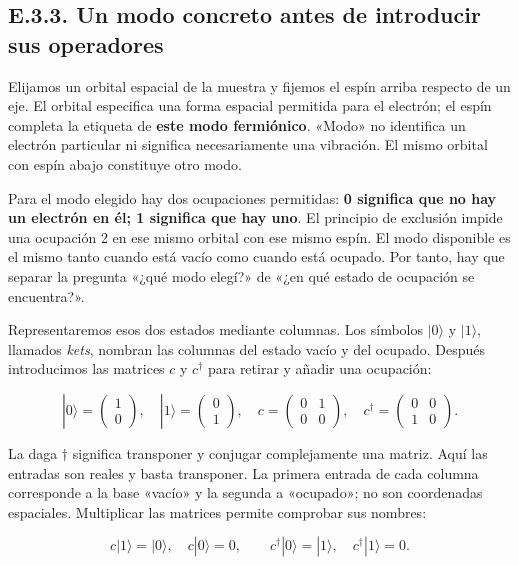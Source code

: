 \documentclass[
  spanish,
  10pt,
  a4paper,
]{article}
\begin{document}
\subsection{E.3.3. Un modo concreto antes de introducir sus
operadores}\label{e.3.3.-un-modo-concreto-antes-de-introducir-sus-operadores}

Elijamos un orbital espacial de la muestra y fijemos el espín arriba
respecto de un eje. El orbital especifica una forma espacial permitida
para el electrón; el espín completa la etiqueta de \textbf{este modo
fermiónico}. «Modo» no identifica un electrón particular ni significa
necesariamente una vibración. El mismo orbital con espín abajo
constituye otro modo.

Para el modo elegido hay dos ocupaciones permitidas: \textbf{0 significa
que no hay un electrón en él; 1 significa que hay uno}. El principio de
exclusión impide una ocupación 2 en ese mismo orbital con ese mismo
espín. El modo disponible es el mismo tanto cuando está vacío como
cuando está ocupado. Por tanto, hay que separar la pregunta «¿qué modo
elegí?» de «¿en qué estado de ocupación se encuentra?».

Representaremos esos dos estados mediante columnas. Los símbolos
\(|0\rangle\) y \(|1\rangle\), llamados \emph{kets}, nombran las
columnas del estado vacío y del ocupado. Después introducimos las
matrices \(c\) y \(c^\dagger\) para retirar y añadir una ocupación:

\[
|0\rangle=\begin{pmatrix}1\\0\end{pmatrix},\quad
|1\rangle=\begin{pmatrix}0\\1\end{pmatrix},\quad
c=\begin{pmatrix}0&1\\0&0\end{pmatrix},\quad
c^\dagger=\begin{pmatrix}0&0\\1&0\end{pmatrix}.
\tag{E.2}
\]

La daga \(\dagger\) significa transponer y conjugar complejamente una
matriz. Aquí las entradas son reales y basta transponer. La primera
entrada de cada columna corresponde a la base «vacío» y la segunda a
«ocupado»; no son coordenadas espaciales. Multiplicar las matrices
permite comprobar sus nombres:

\[
c|1\rangle=|0\rangle,\quad c|0\rangle=0,
\qquad c^\dagger|0\rangle=|1\rangle,\quad c^\dagger|1\rangle=0.
\tag{E.3}
\]
\end{document}
